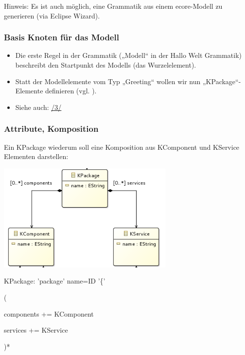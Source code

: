 \documentclass[a4]{article}
\providecommand{\tightlist}{%
  \setlength{\itemsep}{0pt}\setlength{\parskip}{0pt}}
\begin{document}
Hinweis: Es ist auch möglich, eine Grammatik aus einem ecore-Modell zu
generieren (via Eclipse Wizard).

\subsubsection[Basis Knoten für das
Modell]{\texorpdfstring{\protect\hypertarget{anchor-21}{}{}Basis Knoten
für das
Modell}{Basis Knoten für das Modell}}\label{basis-knoten-fuxfcr-das-modell}

\begin{itemize}
\tightlist
\item
  Die erste Regel in der Grammatik („Modell`` in der Hallo Welt
  Grammatik) beschreibt den Startpunkt des Modells (das Wurzelelement).
\item
  Statt der Modellelemente vom Typ „Greeting`` wollen wir nun
  „KPackage``-Elemente definieren (vgl. ).
\item
  Siehe auch: \protect\hyperlink{anchor-3}{/3/}
\end{itemize}

\subsubsection[Attribute,
Komposition]{\texorpdfstring{\protect\hypertarget{anchor-22}{}{}Attribute,
Komposition}{Attribute, Komposition}}\label{attribute-komposition}

Ein KPackage wiederum soll eine Komposition aus KComponent und KService
Elementen darstellen:

\includegraphics[width=3.45830in,height=2.12520in]{./Pictures/100002010000019F000000FFAC91D652B890571C.png}

KPackage: 'package' name=ID '\{'

(

components += KComponent \textbar{}

services += KService

)*
\end{document}
